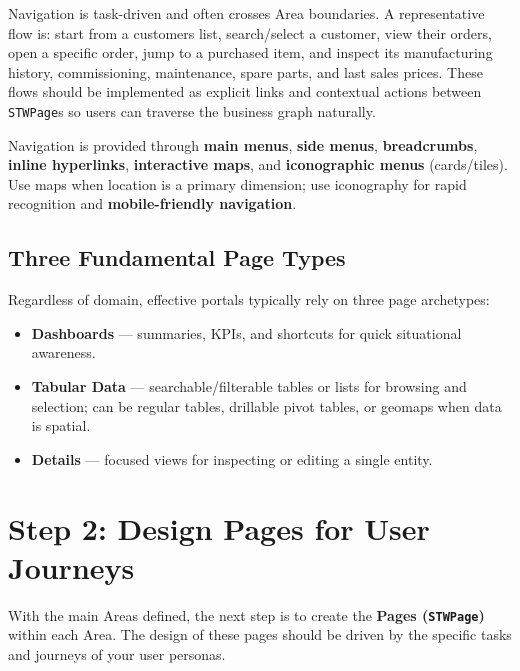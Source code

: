 Navigation is task-driven and often crosses Area boundaries. A representative flow is:
start from a customers list, search/select a customer, view their orders, open a specific order, jump to a purchased item, and inspect its manufacturing history, commissioning, maintenance, spare parts, and last sales prices. These flows should be implemented as explicit links and contextual actions between \texttt{STWPage}s so users can traverse the business graph naturally.

Navigation is provided through \textbf{main menus}, \textbf{side menus}, \textbf{breadcrumbs}, \textbf{inline hyperlinks}, \textbf{interactive maps}, and \textbf{iconographic menus} (cards/tiles). Use maps when location is a primary dimension; use iconography for rapid recognition and \textbf{mobile-friendly navigation}.

\subsection{Three Fundamental Page Types}
Regardless of domain, effective portals typically rely on three page archetypes:
\begin{itemize}
  \item \textbf{Dashboards} — summaries, KPIs, and shortcuts for quick situational awareness.
  \item \textbf{Tabular Data} — searchable/filterable tables or lists for browsing and selection; can be regular tables, drillable pivot tables, or geomaps when data is spatial.
  \item \textbf{Details} — focused views for inspecting or editing a single entity.
\end{itemize}

\section{Step 2: Design Pages for User Journeys}
\label{sec:design-pages}

With the main Areas defined, the next step is to create the \textbf{Pages (\texttt{STWPage})} within each Area. The design of these pages should be driven by the specific tasks and journeys of your user personas.

